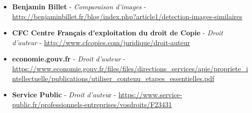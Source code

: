 \documentclass[a4paper,12pt]{article}
\begin{document}
\begin{itemize}
    \item \textbf{Benjamin Billet} - \textit{Comparaison d'images} - \url{http://benjaminbillet.fr/blog/index.php?article1/detection-images-similaires }
    \item \textbf{CFC Centre Français d'exploitation du droit de Copie} - \textit{Droit d'auteur} - \url{http://www.cfcopies.com/juridique/droit-auteur }
    \item \textbf{economie.gouv.fr} - \textit{Droit d'auteur} - \url{https://www.economie.gouv.fr/files/files/directions_services/apie/propriete_intellectuelle/publications/utiliser_contenu_etapes_essentielles.pdf }
    \item \textbf{Service Public} - \textit{Droit d'auteu}r - \url{https://www.service-public.fr/professionnels-entreprises/vosdroits/F23431 }
   
    
    
\end{itemize}






	


\end{document}

